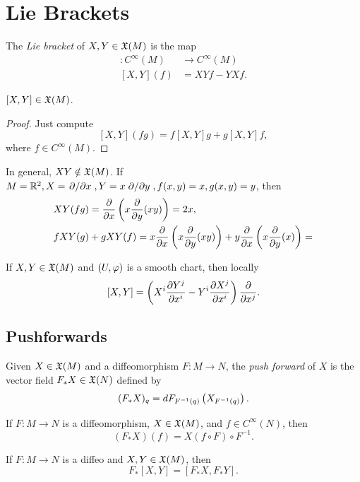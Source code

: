 \section{Lie Brackets}
\begin{definition}
    The \textit{Lie bracket} of $X,Y \in \frak{X}(M)$ is the map
    \begin{align*}
    [X,Y]: C^\infty(M) &\longrightarrow C^\infty(M) \\
    [X,Y](f) &= XYf - YXf.
    \end{align*}
\end{definition}
\begin{lemma} %
    $[X,Y] \in \frak{X}(M)$. 
\end{lemma}
\begin{proof}
    Just compute
    $$[X,Y](fg) = f[X,Y]g + g[X,Y]f, $$ where $f \in C^\infty(M)$. 
\end{proof}
\begin{example}
    In general, $XY \notin \frak{X}(M)$. If $M=\mathbb{R}^2, X=\pdv*{}{x}, Y=x\pdv*{}{y}, f(x,y)=x, g(x,y)=y$, then 
    \begin{align*}
    &XY(fg) = \pdv{}{x}\left( {x\pdv{}{y}}(xy) \right) = 2x, \\
    &fXY(g) + gXY(f) = x\pdv{}{x}\left( {x\pdv{}{y}}(xy) \right) + y \pdv{}{x}\left( x{\pdv{}{y}}(x) \right) = 
    \end{align*}
\end{example}

\begin{proposition}
    If $X,Y \in \frak{X}(M)$ and $(U,\varphi)$ is a smooth chart, then locally
    $$ [X,Y] = \left(X^i \pdv{Y^j}{x^i} - Y^i \pdv{X^j}{x^i}\right) \pdv{}{x^j}. $$
\end{proposition}

\begin{proposition}\label{8.28}
    
\end{proposition}

\subsection*{Pushforwards}
Given $X \in \frak{X}(M)$ and a diffeomorphism $F:M \to N$, the \textit{push forward} of $X$ is the vector field $F_* X \in \frak{X}(N)$ defined by 
$$(F_* X)_q = dF_{F^{-1}(q)}\left( X_{F^{-1}(q)} \right). $$

\begin{lemma}
    If $F:M \to N$ is a diffeomorphism, $X \in \frak{X}(M)$, and $f \in C^\infty(N)$, then 
    $$(F_* X)(f) = X(f \circ F) \circ F^{-1}. $$
\end{lemma}

\begin{corollary}
    If $F:M \to N$ is a diffeo and $X,Y \in \frak{X}(M)$, then 
    $$F_*[X,Y] = [F_*X, F_*Y]. $$
\end{corollary}